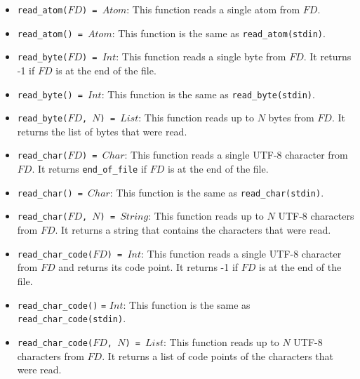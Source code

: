 \begin{itemize}
\item \texttt{read\_atom($FD$) = $Atom$}: This function reads a single atom from $FD$. 

\item \texttt{read\_atom() = $Atom$}: This function is the same as \texttt{read\_atom(stdin)}.
\item \texttt{read\_byte($FD$) = $Int$}: This function reads a single byte from $FD$. It returns -1 if $FD$ is at the end of the file.

\item \texttt{read\_byte() = $Int$}: This function is the same as \texttt{read\_byte(stdin)}.
\item \texttt{read\_byte($FD$, $N$) = $List$}: This function reads up to $N$ bytes from $FD$.  It returns the list of bytes that were read. 

\item \texttt{read\_char($FD$) = $Char$}: This function reads a single UTF-8 character from $FD$. It returns {\tt end\_of\_file} if $FD$ is at the end of the file.
\item \texttt{read\_char() = $Char$}: This function is the same as \texttt{read\_char(stdin)}.
\item \texttt{read\_char($FD$, $N$) = $String$}: This function reads up to $N$ UTF-8 characters from $FD$.  It returns a string that contains the characters that were read.
\item \texttt{read\_char\_code($FD$) = $Int$}: This function reads a single UTF-8 character from $FD$ and returns its code point. It returns -1 if $FD$ is at the end of the file.
\item \texttt{read\_char\_code()} \texttt{=} \texttt{$Int$}: This function is the same as \texttt{read\_char\_code(stdin)}.
\item \texttt{read\_char\_code($FD$, $N$) = $List$}: This function reads up to $N$ UTF-8 characters from $FD$.  It returns a list of code points of the characters that were read.


\end{itemize}
